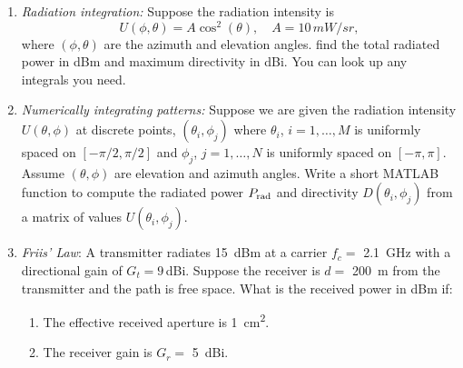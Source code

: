\documentclass[11pt]{article}
\begin{document}
\begin{enumerate}
\item \emph{Radiation integration:}  Suppose the  radiation intensity is
\[
  U(\phi,\theta) = A\cos^2(\theta), \quad A = 10\,\si{mW/sr},
\]
where $(\phi,\theta)$ are the azimuth and elevation angles.
find the total radiated power in dBm and maximum directivity in dBi.
You can look up any integrals you need.


\item \emph{Numerically integrating patterns:}
Suppose we are given the radiation intensity $U(\theta,\phi)$ at discrete points,
$(\theta_i,\phi_j)$ where
$\theta_i$, $i=1,\ldots,M$ is uniformly spaced on $[-\pi/2,\pi/2]$
and $\phi_j$, $j=1,\ldots,N$ is uniformly spaced on $[-\pi,\pi]$.
Assume $(\theta, \phi)$ are elevation and azimuth angles.  Write a short MATLAB function
to compute the radiated power $P_{\rm rad}$ and directivity $D(\theta_i,\phi_j)$
from a matrix of values $U(\theta_i,\phi_j)$.



\item \emph{Friis' Law}:  A transmitter radiates \SI{15}{dBm} at a carrier $f_c =$ \SI{2.1}{GHz}
with a directional gain of $G_t = 9$\,\si{dBi}.
Suppose the receiver is $d =$ \SI{200}{m} from the transmitter and the path is free space.
What is the received power in dBm if:
\begin{enumerate}[label=(\alph*)]
\item The effective received aperture is \SI{1}{cm^2}.
\item The receiver gain is $G_r =$ \SI{5}{dBi}.
\end{enumerate}


\end{enumerate}
\end{document}
